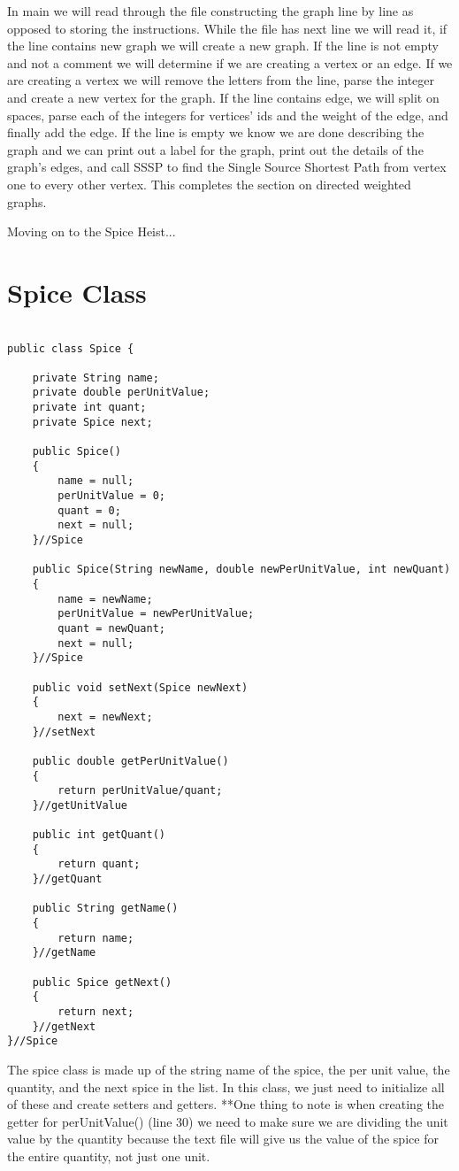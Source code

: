 \documentclass{article}
\begin{document}
\large
In main we will read through the file constructing the graph line by line as opposed to storing the instructions. While the file has next line we will read it, if the line contains new graph we will create a new graph. If the line is not empty and not a comment we will determine if we are creating a vertex or an edge. If we are creating a vertex we will remove the letters from the line, parse the integer and create a new vertex for the graph. If the line contains edge, we will split on spaces, parse each of the integers for vertices' ids and the weight of the edge, and finally add the edge. If the line is empty we know we are done describing the graph and we can print out a label for the graph, print out the details of the graph's edges, and call SSSP to find the Single Source Shortest Path from vertex one to every other vertex. This completes the section on directed weighted graphs. 


\huge
Moving on to the Spice Heist...

\small
\section{Spice Class}
\begin{lstlisting}[frame =single,
backgroundcolor = \color{grey!12}]

public class Spice {

	private String name;
	private double perUnitValue;
	private int quant;
	private Spice next;
	
	public Spice() 
	{
		name = null;
		perUnitValue = 0;
		quant = 0;
		next = null;
	}//Spice
	
	public Spice(String newName, double newPerUnitValue, int newQuant)
	{
		name = newName;
		perUnitValue = newPerUnitValue;
		quant = newQuant;
		next = null;
	}//Spice
	
	public void setNext(Spice newNext)
	{
		next = newNext;
	}//setNext
	
	public double getPerUnitValue()
	{
		return perUnitValue/quant;
	}//getUnitValue
	
	public int getQuant()
	{
		return quant;
	}//getQuant
	
	public String getName()
	{
		return name;
	}//getName
	
	public Spice getNext()
	{
		return next;
	}//getNext
}//Spice

\end{lstlisting}
\large
The spice class is made up of the string name of the spice, the per unit value, the quantity, and the next spice in the list. In this class, we just need to initialize all of these and create setters and getters. **One thing to note is when creating the getter for perUnitValue() (line 30) we need to make sure we are dividing the unit value by the quantity because the text file will give us the value of the spice for the entire quantity, not just one unit. 
\end{document}

